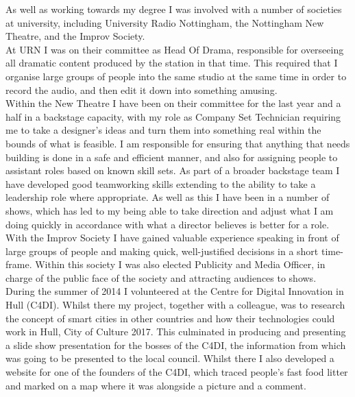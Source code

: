 \documentclass[10pt]{article}
\begin{document}
As well as working towards my degree I was involved with a number of societies at university, including University Radio Nottingham, the Nottingham New Theatre, and the Improv Society.\\

At URN I was on their committee as Head Of Drama, responsible for overseeing all dramatic content produced by the station in that time.
This required that I organise large groups of people into the same studio at the same time in order to record the audio, and then edit it down into something amusing.\\

Within the New Theatre I have been on their committee for the last year and a half in a backstage capacity, with my role as Company Set Technician requiring me to take a designer's ideas and turn them into something real within the bounds of what is feasible.
I am responsible for ensuring that anything that needs building is done in a safe and efficient manner, and also for assigning people to assistant roles based on known skill sets.
As part of a broader backstage team I have developed good teamworking skills extending to the ability to take a leadership role where appropriate.
As well as this I have been in a number of shows, which has led to my being able to take direction and adjust what I am doing quickly in accordance with what a director believes is better for a role.\\

With the Improv Society I have gained valuable experience speaking in front of large groups of people and making quick, well-justified decisions in a short time-frame.
Within this society I was also elected Publicity and Media Officer, in charge of the public face of the society and attracting audiences to shows.\\

During the summer of 2014 I volunteered at the Centre for Digital Innovation in Hull (C4DI).
Whilst there my project, together with a colleague, was to research the concept of smart cities in other countries and how their technologies could work in Hull, City of Culture 2017.
This culminated in producing and presenting a slide show presentation for the bosses of the C4DI, the information from which was going to be presented to the local council.
Whilst there I also developed a website for one of the founders of the C4DI, which traced people's fast food litter and marked on a map where it was alongside a picture and a comment.
\end{document}

